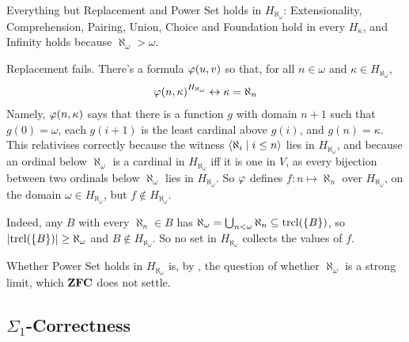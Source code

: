 \begin{boxexample}
    Everything but Replacement and Power Set holds in $H_{\aleph_{\omega}}$: Extensionality, Comprehension, Pairing, Union, Choice and Foundation hold in every $H_{\kappa}$, and Infinity holds because $\aleph_{\omega} > \omega$.

    Replacement fails. There's a formula $\varphi\!\left( u, v \right)$ so that, for all $n \in \omega$ and $\kappa \in H_{\aleph_{\omega}}$,
    \begin{align*}
        \varphi\!\left( n, \kappa \right)^{H_{\aleph_{\omega}}} \leftrightarrow \kappa = \aleph_n
    \end{align*}
    Namely, $\varphi\!\left( n, \kappa \right)$ says that there is a function $g$ with domain $n + 1$ such that $g(0) = \omega$, each $g(i + 1)$ is the least cardinal above $g(i)$, and $g(n) = \kappa$. This relativises correctly because the witness $\left\langle \aleph_i \; \middle| \; i \leq n \right\rangle$ lies in $H_{\aleph_{\omega}}$, and because an ordinal below $\aleph_{\omega}$ is a cardinal in $H_{\aleph_{\omega}}$ iff it is one in $V$, as every bijection between two ordinals below $\aleph_{\omega}$ lies in $H_{\aleph_{\omega}}$. So $\varphi$ defines $f : n \mapsto \aleph_n$ over $H_{\aleph_{\omega}}$, on the domain $\omega \in H_{\aleph_{\omega}}$, but $f \notin H_{\aleph_{\omega}}$.
    \begin{figure}[H]
        \centering
    \end{figure}
    Indeed, any $B$ with every $\aleph_n \in B$ has $\aleph_{\omega} = \bigcup_{n < \omega} \aleph_n \subseteq \operatorname{trcl}\!\left( \left\{ B \right\} \right)$, so $\left\lvert \operatorname{trcl}\!\left( \left\{ B \right\} \right) \right\rvert \geq \aleph_{\omega}$ and $B \notin H_{\aleph_{\omega}}$. So no set in $H_{\aleph_{\omega}}$ collects the values of $f$.

    Whether Power Set holds in $H_{\aleph_{\omega}}$ is, by , the question of whether $\aleph_{\omega}$ is a strong limit, which $\mathbf{ZFC}$ does not settle.
\end{boxexample}

\subsection{$\Sigma_1$-Correctness}

